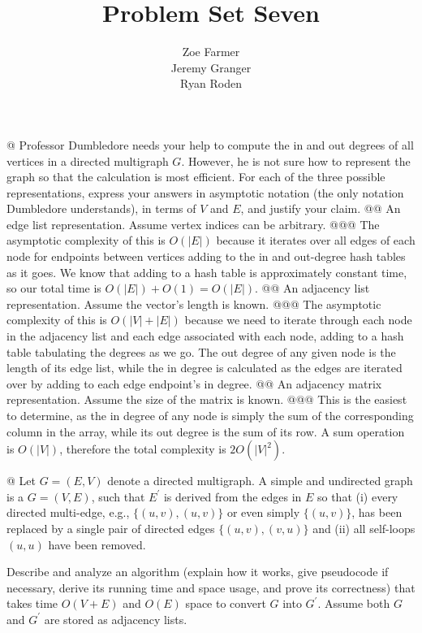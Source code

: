\documentclass[10pt]{article}
\title{Problem Set Seven}
\author{Zoe Farmer\\Jeremy Granger\\Ryan Roden}
\begin{document}
\maketitle

\begin{easylist}[enumerate]
    @ Professor Dumbledore needs your help to compute the in and out degrees of all vertices in a directed multigraph
    $G$. However, he is not sure how to represent the graph so that the calculation is most efficient. For each of the
    three possible representations, express your answers in asymptotic notation (the only notation Dumbledore
    understands), in terms of $V$ and $E$, and justify your claim.
    @@ An edge list representation. Assume vertex indices can be arbitrary.
    @@@ The asymptotic complexity of this is $O(|E|)$  because it iterates over all edges of each node for endpoints
    between vertices adding to the in and out-degree hash tables as it goes. We know that adding to a hash table is
    approximately constant time, so our total time is $O(|E|) + O(1) = O(|E|)$.
    @@ An adjacency list representation. Assume the vector's length is known.
    @@@ The asymptotic complexity of this is $O(|V| + |E|)$ because we need to iterate through each node in the
    adjacency list and each edge associated with each node, adding to a hash table tabulating the degrees as we go. The
    out degree of any given node is the length of its edge list, while the in degree is calculated as the edges are
    iterated over by adding to each edge endpoint's in degree.
    @@ An adjacency matrix representation. Assume the size of the matrix is known.
    @@@ This is the easiest to determine, as the in degree of any node is simply the sum of the corresponding column in
    the array, while its out degree is the sum of its row. A sum operation is $O(|V|)$, therefore the total complexity
    is $2 O(|V|^2)$.

    @ Let $G = (E, V)$ denote a directed multigraph. A simple and undirected graph is a $G = (V, E)$, such that
    $E^\prime$ is derived from the edges in $E$ so that (i) every directed multi-edge, e.g., $\{(u, v), (u, v)\}$ or
    even simply $\{(u, v)\}$, has been replaced by a single pair of directed edges $\{(u, v), (v, u)\}$ and (ii) all
    self-loops $(u, u)$ have been removed.\newline

    Describe and analyze an algorithm (explain how it works, give pseudocode if necessary, derive its running time and
    space usage, and prove its correctness) that takes time $O(V + E)$ and $O(E)$ space to convert $G$ into $G^\prime$.
    Assume both $G$ and $G^\prime$ are stored as adjacency lists.


\end{easylist}
\end{document}
